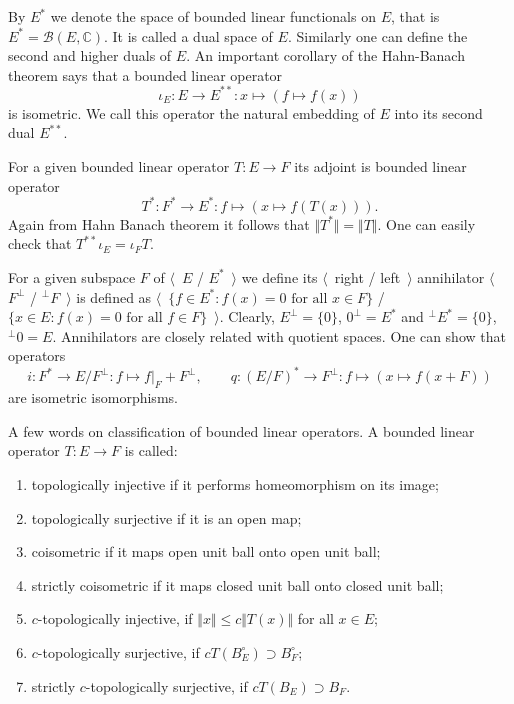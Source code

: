 By $E^*$ we denote the space of bounded linear functionals on $E$, that is
$E^*=\mathcal{B}(E, \mathbb{C})$. It is called a dual space of $E$. Similarly
one can define the second and higher duals of $E$. An important corollary of the
Hahn-Banach theorem says that a bounded linear operator 
$$
\iota_E:E\to E^{**}:x\mapsto (f\mapsto f(x))
$$ 
is isometric. We call this operator the natural embedding of $E$ into its 
second dual $E^{**}$.

For a given bounded linear operator $T:E\to F$ its adjoint is bounded linear 
operator 
$$
T^*:F^*\to E^*:f\mapsto (x\mapsto f(T(x))).
$$
Again from Hahn Banach 
theorem it follows that $\Vert T^*\Vert=\Vert T\Vert$. One can easily check 
that $T^{**}\iota_E=\iota_F T$.  

For a given subspace $F$ of $\langle$~$E$ / $E^*$~$\rangle$ we define 
its $\langle$~right / left~$\rangle$ annihilator 
$\langle$~$F^\perp$ / ${}^\perp F$~$\rangle$ is defined as 
$\langle$~$ \{ f\in E^*: f(x)=0 \mbox{ for all } x\in F \}$ / 
$ \{ x\in E : f(x)=0 \mbox{ for all } f\in F \}$~$\rangle$. 
Clearly, $E^{\perp} = \{ 0\}$, $0^{\perp}=E^*$ 
and ${}^{\perp}E^*= \{ 0\}$, ${}^{\perp}0= E$. Annihilators are closely related
with quotient spaces. One can show that 
operators 
$$
i: F^*\to E/F^{\perp}: f\mapsto f|_F+F^\perp,
\quad\quad 
q:{(E/F)}^*\to F^{\perp}: f\mapsto (x\mapsto f(x + F))
$$ 
are isometric isomorphisms.

A few words on classification of bounded linear operators. A bounded linear
operator $T:E\to F$ is called:
\begin{enumerate}[label = (\roman*)]
  \item topologically injective if it performs homeomorphism on its image;

  \item topologically surjective if it is an open map;

  \item coisometric if it maps open unit ball onto open unit ball;

  \item strictly coisometric if it maps closed unit ball onto closed unit ball; 

  \item $c$-topologically injective, if $\Vert x\Vert\leq c\Vert  T(x)\Vert$ for
  all $x\in E$;

  \item $c$-topologically surjective, if $cT(B_E^\circ)\supset B_F^\circ$;

  \item strictly $c$-topologically surjective, if $cT(B_E)\supset B_F$.
\end{enumerate}

